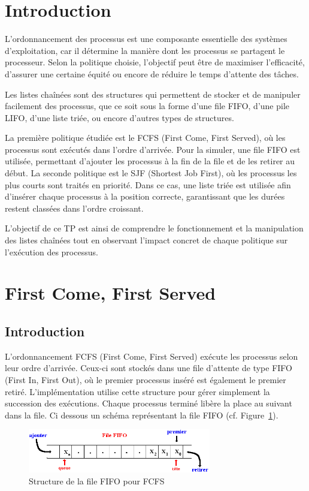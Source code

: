 \section{Introduction}

L’ordonnancement des processus est une composante essentielle des systèmes d’exploitation, car il détermine la manière dont les processus se partagent le processeur. Selon la politique choisie, l’objectif peut être de maximiser l’efficacité, d’assurer une certaine équité ou encore de réduire le temps d’attente des tâches.

Les listes chaînées sont des structures qui permettent de stocker et de manipuler facilement des processus, que ce soit sous la forme d’une file FIFO, d’une pile LIFO, d’une liste triée, ou encore d’autres types de structures.

La première politique étudiée est le FCFS (First Come, First Served), où les processus sont exécutés dans l’ordre d’arrivée. Pour la simuler, une file FIFO est utilisée, permettant d’ajouter les processus à la fin de la file et de les retirer au début. La seconde politique est le SJF (Shortest Job First), où les processus les plus courts sont traités en priorité. Dans ce cas, une liste triée est utilisée afin d’insérer chaque processus à la position correcte, garantissant que les durées restent classées dans l’ordre croissant.

L’objectif de ce TP est ainsi de comprendre le fonctionnement et la manipulation des listes chaînées tout en observant l’impact concret de chaque politique sur l’exécution des processus.

\newpage

\section{First Come, First Served}
\subsection{Introduction}

L’ordonnancement FCFS (First Come, First Served) exécute les processus selon leur ordre d’arrivée. Ceux-ci sont stockés dans une file d’attente de type FIFO (First In, First Out), où le premier processus inséré est également le premier retiré.
L’implémentation utilise cette structure pour gérer simplement la succession des exécutions. Chaque processus terminé libère la place au suivant dans la file.
Ci dessous un schéma représentant la file FIFO (cf. Figure~\ref{fig:fcfs_fifo}).
\begin{figure}[H]
    \centering
    \includegraphics[width=8cm]{../images/fifo.png}
    \caption{Structure de la file FIFO pour FCFS}
    \label{fig:fcfs_fifo}
\end{figure}

